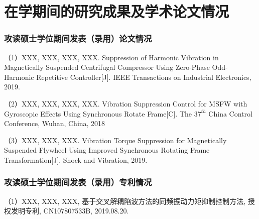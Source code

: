 \chapter{在学期间的研究成果及学术论文情况}

\subsection*{攻读硕士学位期间发表（录用）论文情况}

（1）XXX, XXX, XXX, XXX. Suppression of Harmonic Vibration in Magnetically Suspended Centrifugal Compressor Using Zero-Phase Odd-Harmonic Repetitive Controller[J]. IEEE Transactions on Industrial Electronics, 2019.

（2）XXX, XXX, XXX, XXX. Vibration Suppression Control for MSFW with Gyroscopic Effects Using Synchronous Rotate Frame[C]. The $37^{th}$ China Control Conference, Wuhan, China, 2018
 
（3）XXX, XXX, XXX. Vibration Torque Suppression for Magnetically Suspended Flywheel Using Improved Synchronous Rotating Frame Transformation[J]. Shock and Vibration, 2019.

\subsection*{攻读硕士学位期间发表（录用）专利情况}

（1）XXX, XXX, XXX, 基于交叉解耦陷波方法的同频振动力矩抑制控制方法, 授权发明专利, CN107807533B, 2019.08.20.


